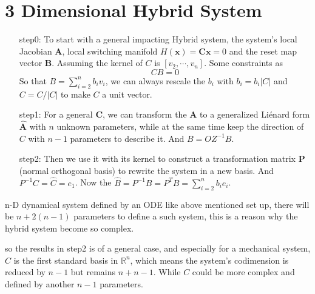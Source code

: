 \documentclass[a4paper,10pt]{article}
\begin{document}
	\section{3 Dimensional Hybrid System}
	\begin{enumerate}
		\item[step0:]  To start with a general impacting Hybrid system, the system's local Jacobian $\mathbf{A}$, local switching manifold $H(\mathbf{x}) = \mathbf{Cx}=0$ and the reset map vector $\mathbf{B}$.  Assuming the kernel of $C$ is $[v_2,\cdots,v_n]$. Some constraints as 
		\[ CB = 0 \]
		So that $B = \sum_{i=2}^{n} b_i v_i$, we can always rescale the $b_i$ with $b_i = b_i  |C|$ and $C = C / |C|$ to make $C$ a unit vector.
 		\item[step1:] For a general $\mathbf{C}$, we can  transform the $\mathbf{A}$ to a generalized Li\'enard form $\hat{\mathbf{A}}$ with $n$ unknown parameters, while at the same time keep the direction of $C$ with $n-1$ parameters to describe it. And $B = OZ^{-1} B$.
 		\item[ step2:] Then we use it with its kernel to construct a transformation matrix $\mathbf{P}$ (normal orthogonal basis) to rewrite the system in a new basis.  And $P^{-1}C = \hat{C} = e_1$. Now the $\hat{B} = P^{-1} B = P^T B = \sum_{i=2}^{n} b_i e_i$.
	\end{enumerate}

	 n-D dynamical system defined by an ODE like above mentioned set up, there will be $n + 2(n -1)$ parameters to define a such system, this is a reason why the hybrid system become so complex.
	 
	 so the results in step2 is of a general case, and especially for a mechanical system, $C$ is the first standard basis in $\mathbb{R}^n$, which means the system's codimension is reduced by $n-1$ but remains $n + n -1$.  While $C$ could be more complex and defined by another $n-1$ parameters. 
	 
\end{document}
